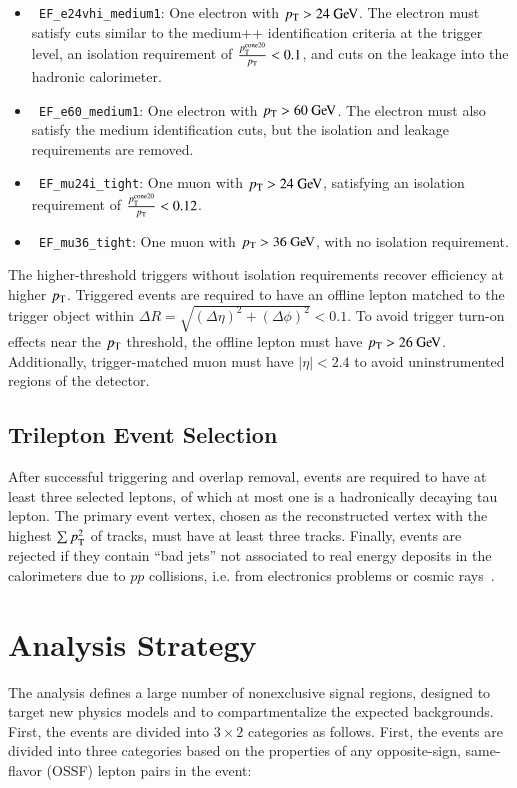 \begin{itemize}
	\item \texttt{ EF\_e24vhi\_medium1}: One electron with $\pt>24 \GeV$. The electron must satisfy cuts similar to the medium++ identification criteria at the trigger level, an isolation requirement of $\frac{p_{\text{T}}^{\mathrm{cone}20}}{p_{\text{T}}}<0.1$, and cuts on the leakage into the hadronic calorimeter.
	\item \texttt{ EF\_e60\_medium1}: One electron with $\pt>60 \GeV$. The electron must also satisfy the medium identification cuts, but the isolation and leakage requirements are removed.
	\item \texttt{ EF\_mu24i\_tight}: One muon with $\pt>24 \GeV$, satisfying an isolation requirement of $\frac{p_{\text{T}}^{\mathrm{cone}20}}{p_{\text{T}}}<0.12$.
	\item \texttt{ EF\_mu36\_tight}: One muon with $\pt>36 \GeV$, with no isolation requirement.
\end{itemize}

The higher-threshold triggers without isolation requirements recover efficiency at higher $p_{\text{T}}$. Triggered events are required to have an offline lepton matched to the trigger object within $\Delta R=\sqrt{(\Delta\eta)^2+(\Delta\phi)^2} < 0.1$. To avoid trigger turn-on effects near the $p_{\text{T}}$ threshold, the offline lepton must have $\pt>26 \GeV$. Additionally, trigger-matched muon must have $|\eta|<2.4$ to avoid uninstrumented regions of the detector.


\subsection{Trilepton Event Selection}\label{sec:model-independent-trilepton-event-selection}
After successful triggering and overlap removal, events are required to have at least three selected leptons, of which at most one is a hadronically decaying tau lepton. The primary event vertex, chosen as the reconstructed vertex with the highest $\sum p_{\text{T}}^2$ of tracks, must have at least three tracks. Finally, events are rejected if they contain ``bad jets'' not associated to real energy deposits in the calorimeters due to $pp$ collisions, i.e. from electronics problems or cosmic rays~\cite{TheATLASCollaboration:2015ds}.


\section{Analysis Strategy}\label{sec:model-independent-analysis-strategy}
The analysis defines a large number of nonexclusive signal regions, designed to target new physics models and to compartmentalize the expected backgrounds. First, the events are divided into $3\times 2$ categories as follows. First, the events are divided into three categories based on the properties of any opposite-sign, same-flavor (OSSF) lepton pairs in the event:

